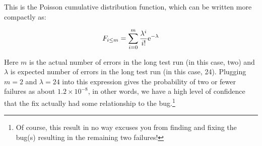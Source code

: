 This is the Poisson cumulative distribution function, which can be
written more compactly as:

\begin{equation}
	F_{i \le m} = \sum_{i=0}^m \frac{\lambda^i}{i!} \mathrm{e}^{-\lambda}
\label{eq:debugging:Possion CDF}
\end{equation}

Here $m$ is the actual number of errors in the long test run
(in this case, two) and $\lambda$ is expected number of errors
in the long test run (in this case, 24).
Plugging $m=2$ and $\lambda=24$ into this expression gives the probability
of two or fewer failures as about
$1.2 \times 10^{-8}$, in other words, we have a high level of confidence
that the fix actually had some relationship to the bug.\footnote{
	Of course, this result in no way excuses you from finding and
	fixing the bug(s) resulting in the remaining two failures!}

